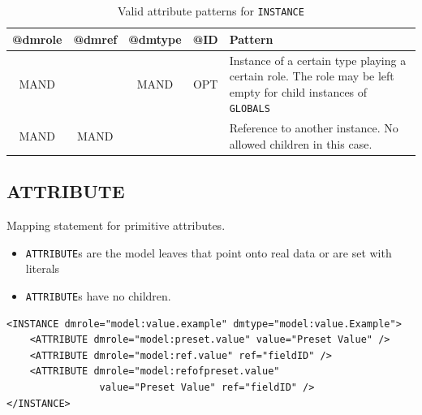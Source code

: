 \documentclass[11pt,a4paper]{ivoa}
\begin{document}
\begin{table}[hbtp]
\small
\centering
\begin{tabulary}{\linewidth}{|c|c|c|c|J|}
    \hline 
        \textbf{@dmrole} & 
        \textbf{@dmref} &  
        \textbf{@dmtype} &  
        \textbf{@ID} &  
        \textbf{Pattern}\\
    \hline      \hline  
        MAND &   
       & 
       MAND & 
       OPT & 
       Instance of a certain type playing a certain role. 
         \newline The role may be left empty  for child instances of 
          \texttt{GLOBALS} \\
    \hline  
       MAND  & 
       MAND  &  
       &  
       & 
       Reference to another instance. 
        \newline  No allowed children in this case.  \\

\hline 
\end{tabulary}
     \caption{Valid attribute patterns for  \texttt{INSTANCE}} 
     \label{tbl:inst-pattern}
 \end{table}

%
%
\subsection{ATTRIBUTE}

Mapping statement for primitive attributes.

\begin{itemize}
    \item \texttt{ATTRIBUTE}s  are the model leaves that point onto real data or are set with literals
    \item \texttt{ATTRIBUTE}s have no children.
\end{itemize}

\begin{lstlisting}[caption={ATTRIBUTE examples},style=XML]
<INSTANCE dmrole="model:value.example" dmtype="model:value.Example">
    <ATTRIBUTE dmrole="model:preset.value" value="Preset Value" />    
    <ATTRIBUTE dmrole="model:ref.value" ref="fieldID" />    
    <ATTRIBUTE dmrole="model:refofpreset.value" 
                value="Preset Value" ref="fieldID" />
</INSTANCE>
\end{lstlisting}
\end{document}
